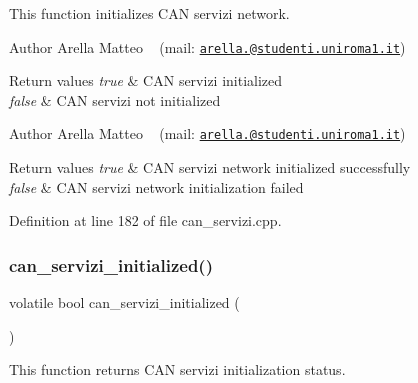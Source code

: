 This function initializes C\+AN servizi network.

\begin{DoxyAuthor}{Author}
Arella Matteo ~\newline
 (mail\+: \href{mailto:arella.1646983@studenti.uniroma1.it}{\tt arella.@studenti.\+uniroma1.\+it})
\end{DoxyAuthor}

\begin{DoxyRetVals}{Return values}
{\em true} & C\+AN servizi initialized \\
\hline
{\em false} & C\+AN servizi not initialized\\
\hline
\end{DoxyRetVals}
\begin{DoxyAuthor}{Author}
Arella Matteo ~\newline
 (mail\+: \href{mailto:arella.1646983@studenti.uniroma1.it}{\tt arella.@studenti.\+uniroma1.\+it})
\end{DoxyAuthor}

\begin{DoxyRetVals}{Return values}
{\em true} & C\+AN servizi network initialized successfully \\
\hline
{\em false} & C\+AN servizi network initialization failed \\
\hline
\end{DoxyRetVals}


Definition at line 182 of file can\+\_\+servizi.\+cpp.

\mbox{\label{group___c_a_n__servizi__group_gaa460928ec03256a076ebafceab10c2be}} 
\subsubsection{\texorpdfstring{can\+\_\+servizi\+\_\+initialized()}{can\_servizi\_initialized()}}
{\footnotesize\ttfamily volatile bool can\+\_\+servizi\+\_\+initialized (\begin{DoxyParamCaption}{ }\end{DoxyParamCaption})}



This function returns C\+AN servizi initialization status. 

